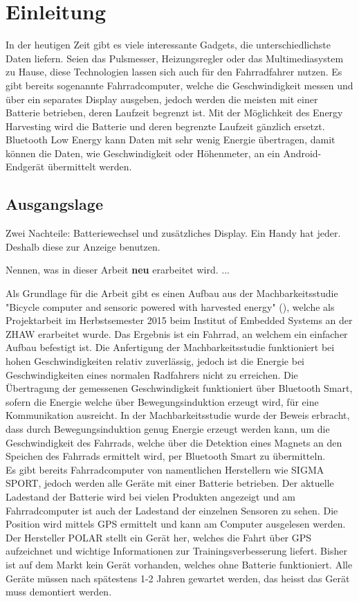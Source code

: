 \chapter{Einleitung}
In der heutigen Zeit gibt es viele interessante Gadgets, die unterschiedlichste Daten liefern. Seien das Pulsmesser, Heizungsregler oder das Multimediasystem zu Hause, diese Technologien lassen sich auch für den Fahrradfahrer nutzen. Es gibt bereits sogenannte Fahrradcomputer, welche die Geschwindigkeit messen und über ein separates Display ausgeben, jedoch werden die meisten mit einer Batterie betrieben, deren Laufzeit begrenzt ist. Mit der Möglichkeit des Energy Harvesting wird die Batterie und deren begrenzte Laufzeit gänzlich ersetzt. Bluetooth Low Energy kann Daten mit sehr wenig Energie übertragen, damit können die Daten, wie Geschwindigkeit oder Höhenmeter, an ein Android-Endgerät übermittelt werden.


\section{Ausgangslage}



Zwei Nachteile: Batteriewechsel und zusätzliches Display. Ein Handy hat jeder. Deshalb diese zur Anzeige benutzen.


Nennen, was in dieser Arbeit \textbf{neu} erarbeitet wird.
...



Als Grundlage für die Arbeit gibt es einen Aufbau aus der Machbarkeitsstudie "Bicycle computer and sensoric powered with harvested energy" (\cite{PA_bicycle}), welche als Projektarbeit im Herbstsemester 2015 beim Institut of Embedded Systems an der ZHAW erarbeitet wurde. Das Ergebnis ist ein Fahrrad, an welchem ein einfacher Aufbau befestigt ist. Die Anfertigung der Machbarkeitsstudie funktioniert bei hohen Geschwindigkeiten relativ zuverlässig, jedoch ist die Energie bei Geschwindigkeiten eines normalen Radfahrers nicht zu erreichen. Die Übertragung der gemessenen Geschwindigkeit funktioniert über Bluetooth Smart, sofern die Energie welche über Bewegungsinduktion erzeugt wird, für eine Kommunikation ausreicht. In der Machbarkeitsstudie wurde der Beweis erbracht, dass durch Bewegungsinduktion genug Energie erzeugt werden kann, um die Geschwindigkeit des Fahrrads, welche über die Detektion eines Magnets an den Speichen des Fahrrads ermittelt wird, per Bluetooth Smart zu übermitteln.\\

Es gibt bereits Fahrradcomputer von namentlichen Herstellern wie SIGMA SPORT, jedoch werden alle Geräte mit einer Batterie betrieben. Der aktuelle Ladestand der Batterie wird bei vielen Produkten angezeigt und am Fahrradcomputer ist auch der Ladestand der einzelnen Sensoren zu sehen. Die Position wird mittels GPS ermittelt und kann am Computer ausgelesen werden. Der Hersteller POLAR stellt ein Gerät her, welches die Fahrt über GPS aufzeichnet und wichtige Informationen zur Trainingsverbesserung liefert. Bisher ist auf dem Markt kein Gerät vorhanden, welches ohne Batterie funktioniert. Alle Geräte müssen nach spätestens 1-2 Jahren gewartet werden, das heisst das Gerät muss demontiert werden.\\

